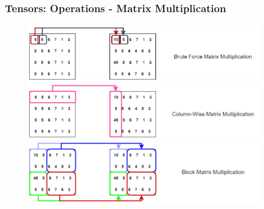 \documentclass[11pt]{beamer}
\begin{document}
\begin{frame}
	\frametitle{Tensors: Operations - Matrix Multiplication}
	
	\begin{figure}
		\includegraphics[width=100mm,scale=0.5]{brute_force_mat_mul}
		\\[\smallskipamount]
		\includegraphics[width=100mm,scale=0.5]{column_wise_mat_mul}
		\\[\smallskipamount]
		\includegraphics[width=100mm,scale=0.5]{block_multiplication}
	\end{figure}
	
%
%
\end{frame}
\end{document}
